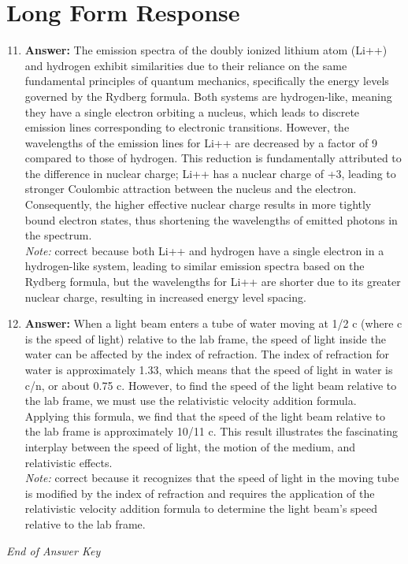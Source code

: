 \documentclass[12pt]{article}
\begin{document}
\section*{Long Form Response}
\begin{enumerate}[label=\arabic*.]
\setcounter{enumi}{10}
\item \textbf{Answer:} The emission spectra of the doubly ionized lithium atom (Li++) and hydrogen exhibit similarities due to their reliance on the same fundamental principles of quantum mechanics, specifically the energy levels governed by the Rydberg formula. Both systems are hydrogen-like, meaning they have a single electron orbiting a nucleus, which leads to discrete emission lines corresponding to electronic transitions. However, the wavelengths of the emission lines for Li++ are decreased by a factor of 9 compared to those of hydrogen. This reduction is fundamentally attributed to the difference in nuclear charge; Li++ has a nuclear charge of +3, leading to stronger Coulombic attraction between the nucleus and the electron. Consequently, the higher effective nuclear charge results in more tightly bound electron states, thus shortening the wavelengths of emitted photons in the spectrum.
\\ \textit{Note:} correct because both Li++ and hydrogen have a single electron in a hydrogen-like system, leading to similar emission spectra based on the Rydberg formula, but the wavelengths for Li++ are shorter due to its greater nuclear charge, resulting in increased energy level spacing.
\item \textbf{Answer:} When a light beam enters a tube of water moving at 1/2 c (where c is the speed of light) relative to the lab frame, the speed of light inside the water can be affected by the index of refraction. The index of refraction for water is approximately 1.33, which means that the speed of light in water is c/n, or about 0.75 c. However, to find the speed of the light beam relative to the lab frame, we must use the relativistic velocity addition formula. Applying this formula, we find that the speed of the light beam relative to the lab frame is approximately 10/11 c. This result illustrates the fascinating interplay between the speed of light, the motion of the medium, and relativistic effects.
\\ \textit{Note:} correct because it recognizes that the speed of light in the moving tube is modified by the index of refraction and requires the application of the relativistic velocity addition formula to determine the light beam's speed relative to the lab frame.
\end{enumerate}

\vfill
\noindent\textit{End of Answer Key}
\end{document}
